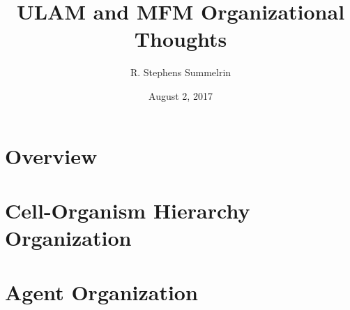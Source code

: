 \documentclass[article]{memoir}
\title{ULAM and MFM Organizational Thoughts}
\date{August 2, 2017}
\author{R. Stephens Summelrin}
\begin{document}
\maketitle
\tableofcontents


\chapter{Overview}



\chapter{Cell-Organism Hierarchy Organization}



\chapter{Agent Organization}
\end{document}
